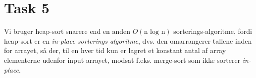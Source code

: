 \section{Task 5}

Vi bruger heap-sort snarere end en anden $O(\text{n log n})$ sorterings-algoritme, fordi heap-sort er en \textit{in-place sorterings algoritme}, dvs. den omarrangerer tallene inden for arrayet, så der, til en hver tid kun er lagret et konstant antal af array elementerne udenfor input arrayet, modsat f.eks. merge-sort som ikke sorterer \textit{in-place}.
